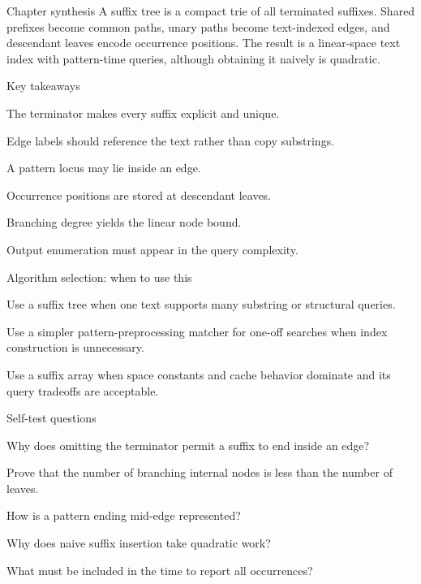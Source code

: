\documentclass[11pt,letterpaper]{article}
\begin{document}
\begin{CornellSummaryBox}{Chapter synthesis}
A suffix tree is a compact trie of all terminated suffixes. Shared prefixes become common paths, unary paths become text-indexed edges, and descendant leaves encode occurrence positions. The result is a linear-space text index with pattern-time queries, although obtaining it naively is quadratic.
\end{CornellSummaryBox}

\begin{CornellSummaryBox}{Key takeaways}
\begin{CornellRecallList}
  \item The terminator makes every suffix explicit and unique.
  \item Edge labels should reference the text rather than copy substrings.
  \item A pattern locus may lie inside an edge.
  \item Occurrence positions are stored at descendant leaves.
  \item Branching degree yields the linear node bound.
  \item Output enumeration must appear in the query complexity.
\end{CornellRecallList}
\end{CornellSummaryBox}

\begin{CornellOverviewBox}{Algorithm selection: when to use this}
\begin{CornellChecklist}
  \item Use a suffix tree when one text supports many substring or structural queries.
  \item Use a simpler pattern-preprocessing matcher for one-off searches when index construction is unnecessary.
  \item Use a suffix array when space constants and cache behavior dominate and its query tradeoffs are acceptable.
\end{CornellChecklist}
\end{CornellOverviewBox}

\begin{CornellExamBox}{Self-test questions}
\begin{CornellRecallList}
  \item Why does omitting the terminator permit a suffix to end inside an edge?
  \item Prove that the number of branching internal nodes is less than the number of leaves.
  \item How is a pattern ending mid-edge represented?
  \item Why does naive suffix insertion take quadratic work?
  \item What must be included in the time to report all occurrences?
\end{CornellRecallList}
\end{CornellExamBox}
\end{document}
